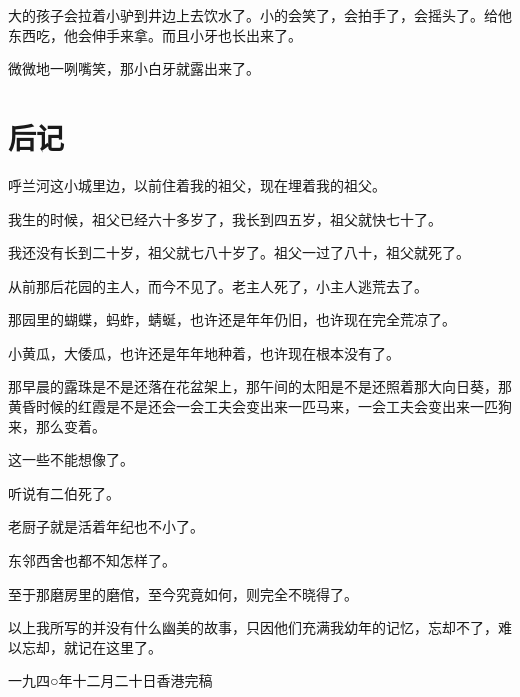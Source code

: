 \documentclass[UTF8]{ctexart}
\begin{document}
大的孩子会拉着小驴到井边上去饮水了。小的会笑了，会拍手了，会摇头了。给他东西吃，他会伸手来拿。而且小牙也长出来了。

微微地一咧嘴笑，那小白牙就露出来了。

\section{后记}

呼兰河这小城里边，以前住着我的祖父，现在埋着我的祖父。

我生的时候，祖父已经六十多岁了，我长到四五岁，祖父就快七十了。

我还没有长到二十岁，祖父就七八十岁了。祖父一过了八十，祖父就死了。

从前那后花园的主人，而今不见了。老主人死了，小主人逃荒去了。

那园里的蝴蝶，蚂蚱，蜻蜒，也许还是年年仍旧，也许现在完全荒凉了。

小黄瓜，大倭瓜，也许还是年年地种着，也许现在根本没有了。

那早晨的露珠是不是还落在花盆架上，那午间的太阳是不是还照着那大向日葵，那黄昏时候的红霞是不是还会一会工夫会变出来一匹马来，一会工夫会变出来一匹狗来，那么变着。

这一些不能想像了。

听说有二伯死了。

老厨子就是活着年纪也不小了。

东邻西舍也都不知怎样了。

至于那磨房里的磨倌，至今究竟如何，则完全不晓得了。

以上我所写的并没有什么幽美的故事，只因他们充满我幼年的记忆，忘却不了，难以忘却，就记在这里了。

一九四○年十二月二十日香港完稿
\end{document}
